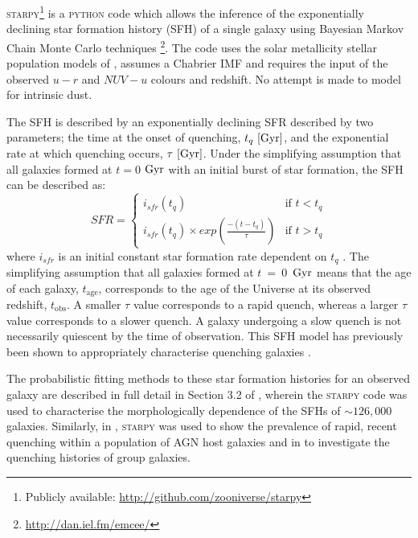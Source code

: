 \documentclass[useAMS,usenatbib]{mn2e}
\begin{document}
\textsc{starpy}\footnote{Publicly available: \url{http://github.com/zooniverse/starpy}} is a \textsc{python} code which allows the inference of the exponentially declining star formation history (SFH) of a single galaxy using  Bayesian Markov Chain Monte Carlo techniques \citep{emcee13}\footnote{\url{http://dan.iel.fm/emcee/}}. The code uses the solar metallicity stellar population models of \cite[][hereafter BC03]{BC03}, assumes a Chabrier IMF \citep{chabrier03} and requires the input of the observed $u-r$ and $NUV-u$ colours and redshift. No attempt is made to model for intrinsic dust. 

The SFH is described by an exponentially declining SFR described by two parameters; the time at the onset of quenching, $t_q~\rm{[Gyr]}$, and the exponential rate at which quenching occurs, $\tau~\rm{[Gyr]}$. Under the simplifying assumption that all galaxies formed at $t=0$ $\rm{ Gyr}$ with an initial burst of star formation, the SFH can be described as:
\begin{equation}\label{sfh}
SFR =
\begin{cases}
i_{sfr}(t_q) & \text{if } t < t_q \\
i_{sfr}(t_q) \times exp{\left( \frac{-(t-t_{q})}{\tau}\right)} & \text{if } t > t_q 
\end{cases}
\end{equation}
where $i_{sfr}$ is an initial constant star formation rate dependent on $t_q$ \citep{schawinski14, smethurst15}. The simplifying assumption that all galaxies formed at $t~=~0$~$\rm{Gyr}$ means that the age of each galaxy, $t_\mathrm{age}$, corresponds to the age of the Universe at its observed redshift, $t_\mathrm{obs}$. A smaller $\tau$ value corresponds to a rapid quench, whereas a larger $\tau$ value corresponds to a slower quench. A galaxy undergoing a slow quench is not necessarily quiescent by the time of observation. This SFH model has previously been shown to appropriately characterise quenching galaxies \citep{Weiner06, Martin07, Noeske07,schawinski14}. 

The probabilistic fitting methods to these star formation histories for an observed galaxy are described in full detail in Section 3.2 of \cite{smethurst15}, wherein the \textsc{starpy} code was used to characterise the morphologically dependence of the SFHs of $\sim126,000$ galaxies. Similarly, in \cite{smethurst16}, \textsc{starpy} was used to show the prevalence of rapid, recent quenching within a population of AGN host galaxies and in \cite{smethurst17} to investigate the quenching histories of group galaxies.  
\end{document}

